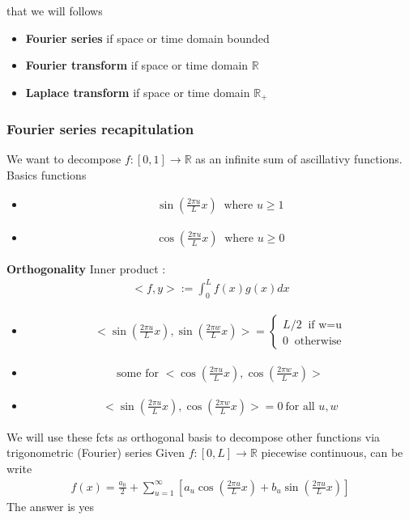  that we will follows
\begin{itemize}
    \item  \textbf{Fourier series} if space or time domain bounded 
    \item \textbf{Fourier transform} if space or time domain $\mathbb{R}$
    \item \textbf{Laplace transform} if space or time domain $\mathbb{R}_+$
\end{itemize}

\subsubsection{Fourier series recapitulation}
We want to decompose $f: [0, 1] \rightarrow \mathbb{R}$ as an infinite sum of ascillativy functions. Basics functions
\begin{itemize}
    \item \begin{align*}
        \sin(\frac{2 \pi u}{L}x) \ \text{ where } u \geq 1
    \end{align*}
    \item \begin{align*}
        \cos(\frac{2 \pi u}{L}x) \ \text{ where } u \geq 0
    \end{align*}
\end{itemize}
\textbf{Orthogonality} Inner product : \begin{align*}
    <f,y> := \int_0^L f(x)g(x)dx
\end{align*}
\begin{itemize}
    \item \begin{align*}
        <\sin(\frac{2 \pi u}{L}x), \sin(\frac{2 \pi w}{L}x)> = \begin{cases}
            L/ 2 \ \text{ if w=u}
            \\ 0 \ \text{ otherwise}
        \end{cases}
    \end{align*}
    \item \begin{align*}
        \text{some for } <\cos(\frac{2 \pi u}{L}x), \cos(\frac{2 \pi w}{L}x)>
    \end{align*}
    \item \begin{align*}
        <\sin(\frac{2 \pi u}{L}x), \cos(\frac{2 \pi w}{L}x)> = 0 \ \text{for all } u,w
    \end{align*}
\end{itemize}
We will use these fcts as orthogonal basis to decompose other functions via trigonometric (Fourier) series
Given $f: [0,L] \rightarrow \mathbb{R}$ piecewise continuous, can be write  
\begin{align*}
    f(x) = \frac{a_0}{2} + \sum_{u=1}^\infty [a_u \cos(\frac{2 \pi u}{L}x) + b_u \sin(\frac{2 \pi u}{L}x)]
\end{align*}
The answer is yes

